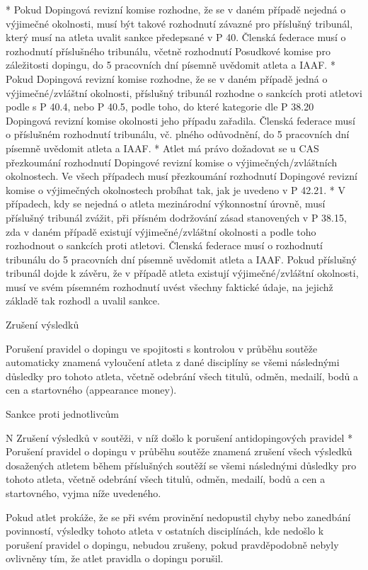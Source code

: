* Pokud Dopingová revizní komise rozhodne, že se v daném případě nejedná o výjimečné okolnosti, musí být takové rozhodnutí závazné pro příslušný tribunál, který musí na atleta uvalit sankce předepsané v P 40. Členská federace musí o rozhodnutí příslušného tribunálu, včetně rozhodnutí Posudkové komise pro záležitosti dopingu, do 5 pracovních dní písemně uvědomit atleta a IAAF.
* Pokud Dopingová revizní komise rozhodne, že se v daném případě jedná o výjimečné/zvláštní okolnosti, příslušný tribunál rozhodne o sankcích proti atletovi podle s P 40.4, nebo P 40.5, podle toho, do které kategorie dle P 38.20 Dopingová revizní komise okolnosti jeho případu zařadila. Členská federace musí o příslušném rozhodnutí tribunálu, vč. plného odůvodnění, do 5 pracovních dní písemně uvědomit atleta a IAAF.
* Atlet má právo dožadovat se u CAS přezkoumání rozhodnutí Dopingové revizní komise o výjimečných/zvláštních okolnostech. Ve všech případech musí přezkoumání rozhodnutí Dopingové revizní komise o výjimečných okolnostech probíhat tak, jak je uvedeno v P 42.21.
* V případech, kdy se nejedná o atleta mezinárodní výkonnostní úrovně, musí příslušný tribunál zvážit, při přísném dodržování zásad stanovených v P 38.15, zda v daném případě existují výjimečné/zvláštní okolnosti a podle toho rozhodnout o sankcích proti atletovi. Členská federace musí o rozhodnutí tribunálu do 5 pracovních dní písemně uvědomit atleta a IAAF. Pokud příslušný tribunál dojde k závěru, že v případě atleta existují výjimečné/zvláštní okolnosti, musí ve svém písemném rozhodnutí uvést všechny faktické údaje, na jejichž základě tak rozhodl a uvalil sankce.
\enditems

\secc Zrušení výsledků

Porušení pravidel o dopingu ve spojitosti s kontrolou v průběhu soutěže automaticky znamená vyloučení atleta z dané disciplíny se všemi následnými důsledky pro tohoto atleta, včetně odebrání všech titulů, odměn, medailí, bodů a cen a startovného (appearance money).

\secc Sankce proti jednotlivcům

\begitems \style N
Zrušení výsledků v soutěži, v níž došlo k porušení antidopingových pravidel
* Porušení pravidel o dopingu v průběhu soutěže znamená zrušení všech výsledků dosažených atletem během příslušných soutěží se všemi následnými důsledky pro tohoto atleta, včetně odebrání všech titulů, odměn, medailí, bodů a cen a startovného, vyjma níže uvedeného.

Pokud atlet prokáže, že se při svém provinění nedopustil chyby nebo zanedbání povinností, výsledky tohoto atleta v ostatních disciplínách, kde nedošlo k porušení pravidel o dopingu, nebudou zrušeny, pokud pravděpodobně nebyly ovlivněny tím, že atlet pravidla o dopingu porušil.

